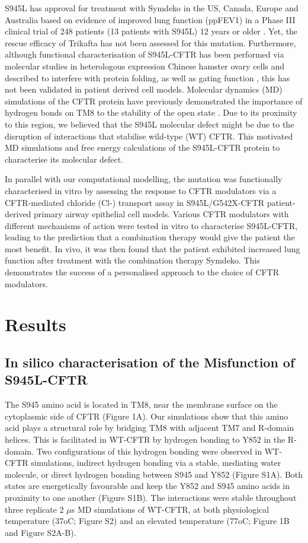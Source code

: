 S945L has approval for treatment with Symdeko in the US, Canada, Europe and Australia based on evidence of improved lung function (ppFEV1) in a Phase III clinical trial of 248 patients (13 patients with S945L) 12 years or older \cite{rowe2017}. Yet, the rescue efficacy of Trikafta has not been assessed for this mutation. Furthermore, although functional characterisation of S945L-CFTR has been performed via molecular studies in heterologous expression Chinese hamster ovary cells and described to interfere with protein folding, as well as gating function \cite{seibert1996}, this has not been validated in patient derived cell models. Molecular dynamics (MD) simulations of the CFTR protein have previously demonstrated the importance of hydrogen bonds on TM8 to the stability of the open state \cite{corradi2018}. Due to its proximity to this region, we believed that the S945L molecular defect might be due to the disruption of interactions that stabilise wild-type (WT) CFTR. This motivated MD simulations and free energy calculations of the S945L-CFTR protein to characterise its molecular defect.

 In parallel with our computational modelling, the mutation was functionally characterised in vitro by assessing the response to CFTR modulators via a CFTR-mediated chloride (Cl-) transport assay in S945L/G542X-CFTR patient-derived primary airway epithelial cell models. Various CFTR modulators with different mechanisms of action were tested in vitro to characterise S945L-CFTR, leading to the prediction that a combination therapy would give the patient the most benefit. In vivo, it was then found that the patient exhibited increased lung function after treatment with the combination therapy Symdeko. This demonstrates the success of a personalised approach to the choice of CFTR modulators. 

\section{Results}

\subsection{In silico characterisation of the Misfunction of S945L-CFTR}
The S945 amino acid is located in TM8, near the membrane surface on the cytoplasmic side of CFTR (Figure 1A). Our simulations show that this amino acid plays a structural role by bridging TM8 with adjacent TM7 and R-domain helices. This is facilitated in WT-CFTR by hydrogen bonding to Y852 in the R-domain. Two configurations of this hydrogen bonding were observed in WT-CFTR simulations, indirect hydrogen bonding via a stable, mediating water molecule, or direct hydrogen bonding between S945 and Y852 (Figure S1A). Both states are energetically favourable and keep the Y852 and S945 amino acids in proximity to one another (Figure S1B). The interactions were stable throughout three replicate 2 $\mu$s MD simulations of WT-CFTR, at both physiological temperature (37oC; Figure S2) and an elevated temperature (77oC; Figure 1B and Figure S2A-B). 

